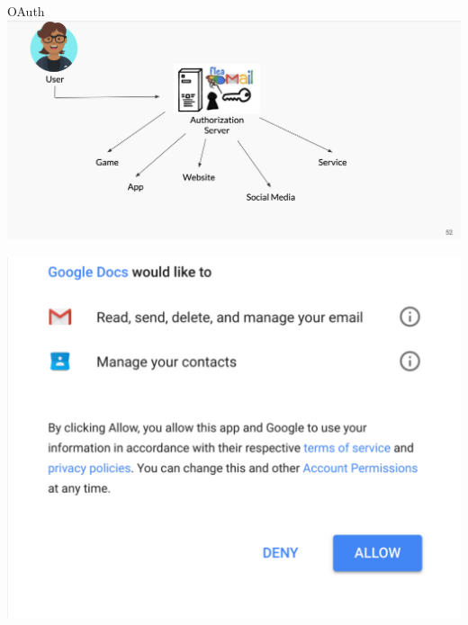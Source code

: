 \documentclass[nobackground,dvipsnames,table,aspectratio=169]{beamer}
\begin{document}
\begin{frame}{OAuth}
    \includegraphics[width=\textwidth]{oauth}
\end{frame}

\begin{frame}{}
    \thispagestyle{empty}
\end{frame}

\begin{frame}{}
    \centering
    \includegraphics[height=0.8\textheight]{google-docs-permissions}
\end{frame}
\end{document}
